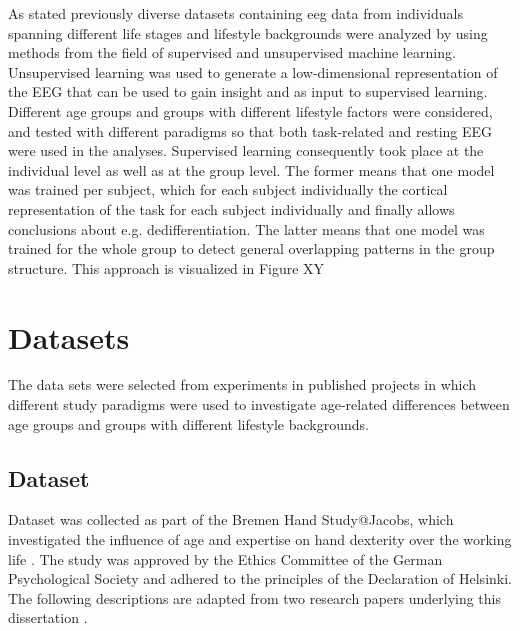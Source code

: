 As stated previously diverse datasets containing \gls{eeg} data from individuals spanning different life stages and lifestyle backgrounds were analyzed by using methods from the field of supervised and unsupervised machine learning. Unsupervised learning was used to generate a low-dimensional representation of the EEG that can be used to gain insight and as input to supervised learning. Different age groups and groups with different lifestyle factors were considered, and tested with different paradigms so that both task-related and resting EEG were used in the analyses. Supervised learning consequently took place at the individual level as well as at the group level. The former means that one model was trained per subject, which for each subject individually the cortical representation of the task for each subject individually and finally allows conclusions about e.g. dedifferentiation. The latter means that one model was trained for the whole group to detect general overlapping patterns in the group structure. This approach is visualized in Figure XY

\section{Datasets}
The data sets were selected from experiments in published projects in which different study paradigms were used to investigate age-related differences between age groups and groups with different lifestyle backgrounds.

\subsection{Dataset }
\label{methods:datasets:I}
Dataset  was collected as part of the Bremen Hand Study@Jacobs, which investigated the influence of age and expertise on hand dexterity over the working life \cite{Voelcker-Rehage2013}. The study was approved by the Ethics Committee of the German Psychological Society and adhered to the principles of the Declaration of Helsinki. The following descriptions are adapted from two research papers underlying this dissertation \cite{Gaidai2022, Goelz2021a}.

